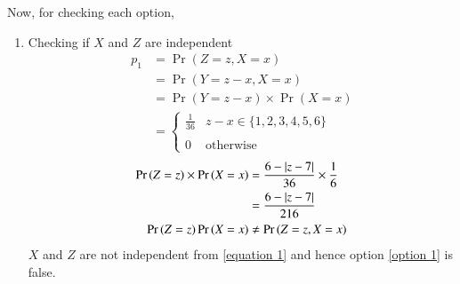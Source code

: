 \documentclass[journal,12pt,twocolumn]{IEEEtran}
\begin{document}
Now, for checking each option,
\begin{enumerate}
    
\item Checking if $X$ and $Z$ are independent
\begin{align}
    p_1 &= \Pr{(Z=z, X=x)}
    \\ &= \Pr{(Y=z-x, X=x)}
    \\ &= \Pr{(Y=z-x)} \times \Pr{(X=x)}
    \\ &= \begin{cases}
        \frac{1}{36} & z-x \in \{1, 2, 3, 4, 5, 6\}\\ ~\\[-1em]
        0 & \text{otherwise}
    \end{cases}
\end{align}
\begin{align}
    \Pr{(Z=z)}\times \Pr{(X=x)} &= \frac{6 - \vert z-7\vert}{36} \times \frac{1}{6}
    \\&= \frac{6 - \vert z-7\vert}{216}
    \\\Pr{(Z=z)}\Pr{(X=x)} &\neq \Pr{(Z=z, X=x)}  \label{equation 1}
\end{align}
$X$ and $Z$ are not independent from \eqref{equation 1} and hence option \eqref{option 1} is false.


\end{enumerate}
\end{document}
